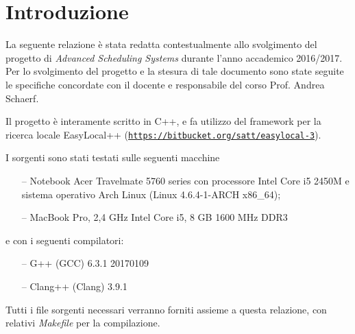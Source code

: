 
\section{Introduzione} %
\label{sec:introduction}
    
    La seguente relazione è stata redatta contestualmente allo svolgimento del progetto di \emph{Advanced Scheduling Systems} durante l'anno accademico 2016/2017. Per lo svolgimento del progetto e la stesura di tale documento sono state seguite le specifiche concordate con il docente e responsabile del corso Prof. Andrea Schaerf.

    Il progetto è interamente scritto in C++, e fa utilizzo del framework per la ricerca locale EasyLocal++ (\href{https://bitbucket.org/satt/easylocal-3}{\texttt{https://bitbucket.org/satt/easylocal-3}}).

    I sorgenti sono stati testati sulle seguenti macchine
    \begin{itemize}
        \item[--] Notebook Acer Travelmate 5760 series con processore Intel Core i5 2450M e sistema operativo Arch Linux (Linux 4.6.4-1-ARCH x86\_64);
        \item[--] MacBook Pro, 2,4 GHz Intel Core i5, 8 GB 1600 MHz DDR3
    \end{itemize}
    e con i seguenti compilatori:
    \begin{itemize}
        \item[--] G++ (GCC) 6.3.1 20170109
        \item[--] Clang++ (Clang) 3.9.1
    \end{itemize}

    Tutti i file sorgenti necessari verranno forniti assieme a questa relazione, con relativi \emph{Makefile} per la compilazione. 

